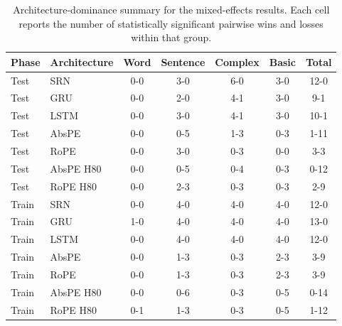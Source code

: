 \begin{table}[t]
\centering\scriptsize
\begin{tabular}{@{}llccccc@{}}
\toprule
\textbf{Phase} & \textbf{Architecture} & \textbf{Word} & \textbf{Sentence} & \textbf{Complex} & \textbf{Basic} & \textbf{Total} \\
\midrule
Test & SRN & 0-0 & 3-0 & 6-0 & 3-0 & 12-0 \\
Test & GRU & 0-0 & 2-0 & 4-1 & 3-0 & 9-1 \\
Test & LSTM & 0-0 & 3-0 & 4-1 & 3-0 & 10-1 \\
Test & AbsPE & 0-0 & 0-5 & 1-3 & 0-3 & 1-11 \\
Test & RoPE & 0-0 & 3-0 & 0-3 & 0-0 & 3-3 \\
Test & AbsPE H80 & 0-0 & 0-5 & 0-4 & 0-3 & 0-12 \\
Test & RoPE H80 & 0-0 & 2-3 & 0-3 & 0-3 & 2-9 \\
Train & SRN & 0-0 & 4-0 & 4-0 & 4-0 & 12-0 \\
Train & GRU & 1-0 & 4-0 & 4-0 & 4-0 & 13-0 \\
Train & LSTM & 0-0 & 4-0 & 4-0 & 4-0 & 12-0 \\
Train & AbsPE & 0-0 & 1-3 & 0-3 & 2-3 & 3-9 \\
Train & RoPE & 0-0 & 1-3 & 0-3 & 2-3 & 3-9 \\
Train & AbsPE H80 & 0-0 & 0-6 & 0-3 & 0-5 & 0-14 \\
Train & RoPE H80 & 0-1 & 1-3 & 0-3 & 0-5 & 1-12 \\
\bottomrule
\end{tabular}
\caption{\small Architecture-dominance summary for the mixed-effects results. Each cell reports the number of statistically significant pairwise wins and losses within that group.}
\label{tab:mixed_effects_arch_dominance}
\end{table}
